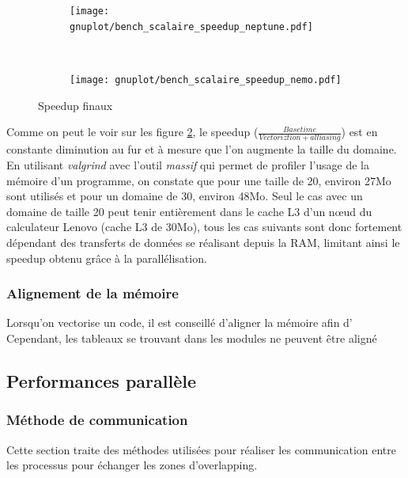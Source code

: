 \begin{figure}[!ht]
  \centering
  \begin{subfigure}[b]{0.5\textwidth}
    \centering
    \texttt{[image: gnuplot/bench\_scalaire\_speedup\_neptune.pdf]}
  \caption{\label{fig:bench_scal_neptune_speedup}}
  \end{subfigure}%
  ~
  \begin{subfigure}[b]{0.5\textwidth}
    \centering
    \texttt{[image: gnuplot/bench\_scalaire\_speedup\_nemo.pdf]}
  \caption{\label{fig:bench_scal_nemo_speedup}}
  \end{subfigure}
  \caption{\label{fig:bench_scal_speedups}Speedup finaux}
\end{figure}

Comme on peut le voir sur les figure \ref{fig:bench_scal_nemo_speedup}, le speedup ($\frac{Base time}{Vectoriztion+alliasing}$) est en constante diminution au fur et à mesure que l'on augmente la taille du domaine. En utilisant \textit{valgrind} avec l'outil \textit{massif} qui permet de profiler l'usage de la mémoire d'un programme, on constate que pour une taille de 20, environ 27Mo sont utilisés et pour un domaine de 30, environ 48Mo. Seul le cas avec un domaine de taille 20 peut tenir entièrement dans le cache L3 d'un nœud du calculateur Lenovo (cache L3 de 30Mo), tous les cas suivants sont donc fortement dépendant des transferts de données se réalisant depuis la RAM, limitant ainsi le speedup obtenu grâce à la parallélisation.

\subsubsection{Alignement de la mémoire}
Lorsqu'on vectorise un code, il est conseillé d'aligner la mémoire afin d'
Cependant, les tableaux se trouvant dans les modules ne peuvent être aligné



\subsection{Performances parallèle}


\subsubsection{Méthode de communication}
Cette section traite des méthodes utilisées pour réaliser les communication entre les processus pour échanger les zones d'overlapping.



